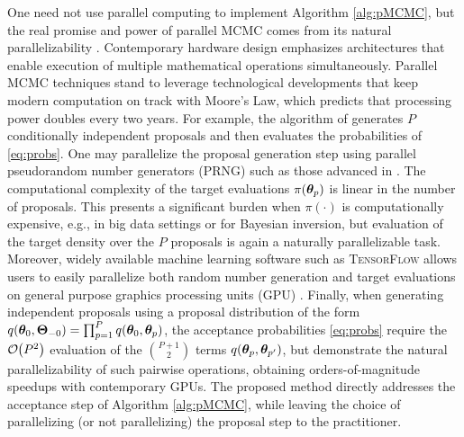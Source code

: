 \documentclass[12pt]{article} %
\newcommand{\order}[1]{{\cal O}\hspace{-0.2em}\left( #1 \right)}
\begin{document}
One need not use parallel computing to implement Algorithm \ref{alg:pMCMC}, but the real promise and power of parallel MCMC comes from its natural parallelizability \citep{calderhead2014general}. 
  Contemporary hardware design emphasizes architectures that enable execution of multiple mathematical operations simultaneously. Parallel MCMC techniques stand to leverage technological developments that keep modern computation on track with Moore's Law, which predicts that processing power doubles every two years.  For example, the algorithm of \citet{tjelmeland2004using} generates $P$ conditionally independent proposals and then evaluates the probabilities of \eqref{eq:probs}.  One may parallelize the proposal generation step using parallel pseudorandom number generators (PRNG) such as those advanced in \citet{salmon2011parallel}. The computational complexity of the target evaluations $\pi(\boldsymbol{\theta}_p)$ is linear in the number of proposals. This presents a significant burden when $\pi(\cdot)$ is computationally expensive, e.g., in big data settings or for Bayesian inversion, but evaluation of the target density over the $P$ proposals is again a naturally parallelizable task.  Moreover, widely available machine learning software such as \textsc{TensorFlow} allows users to easily parallelize both random number generation and target evaluations on general purpose graphics processing units (GPU) \citep{lao2020tfp}. Finally, when generating independent proposals using a proposal distribution of the form $q(\boldsymbol{\theta}_0,\boldsymbol{\Theta}_{-0})=\prod_{p=1}^Pq(\boldsymbol{\theta}_0,\boldsymbol{\theta}_{p})$, the acceptance probabilities \eqref{eq:probs} require the $\order{P^2}$ evaluation of the $P+1\choose 2$ terms $q(\boldsymbol{\theta}_{p},\boldsymbol{\theta}_{p'})$, but \citet{massive,holbrook2021scalable} demonstrate the natural parallelizability of such pairwise operations, obtaining orders-of-magnitude speedups with contemporary GPUs.  The proposed method directly addresses the acceptance step of Algorithm \ref{alg:pMCMC}, while leaving the choice of parallelizing (or not parallelizing) the proposal step to the practitioner.  
\end{document}
